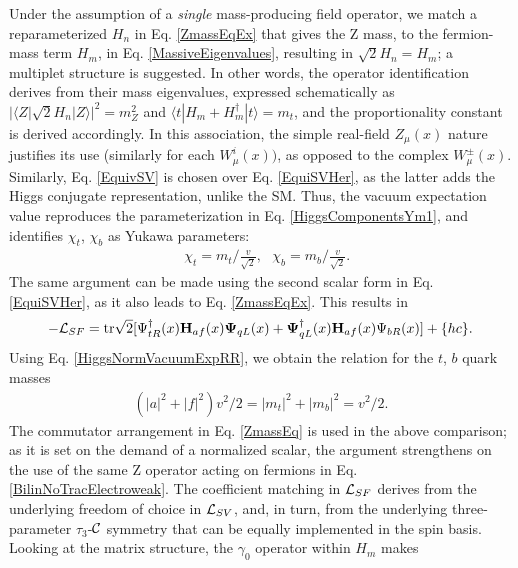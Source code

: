 \documentclass[12pt]{article}
\renewcommand\[{\begin{dmath}}
\renewcommand\]{\end{dmath}}
\newcommand{\boldmathPsi}{\mbox{\boldmath$\Psi$\unboldmath}}
\begin{document}
Under the assumption of a   {\it single} mass-producing field  operator, we match
a reparameterized  $H_n$ in  Eq. \ref{ZmassEqEx} that gives   the  Z  mass,  to   the fermion-mass  term  $H_m$, in Eq.  \ref{MassiveEigenvalues},   resulting in  ${\sqrt{2}H_{n}= }H_{m}$; a  multiplet structure is suggested. In other words,   the operator identification  derives from their mass eigenvalues,  expressed schematically as $|\langle Z |{\sqrt{2}} H_{n}   | Z  \rangle|^2 =m_Z^ 2$ and
  $\langle t |  H_{m} +H_{m}^\dagger | t  \rangle  =m_t $,   and the proportionality constant is  derived  accordingly.
 In this association,   the  simple real-field $Z_\mu(x)$    nature  justifies its use (similarly for each  $W_\mu^i (x) )$,  as opposed to the       complex $W_\mu^\pm(x)$.
 Similarly, Eq. \ref{EquivSV} is chosen over Eq. \ref{EquiSVHer}, as the latter adds the Higgs conjugate representation, unlike the SM.
Thus, the  vacuum expectation value
reproduces  the parameterization in Eq. \ref{HiggsComponentsYm1}, and   identifies  $\chi_t$, $  \chi_b$   as Yukawa parameters: \begin{eqnarray}
\label {YukawaParameters} \ \ \ \  \chi_t= m_t/\frac{v}{\sqrt{2}}  ,  \ \ \  \chi_b= m_b/\frac{v}{\sqrt{2}} .\end{eqnarray} The same argument can be made using the second scalar form in  Eq. \ref{EquiSVHer}, as it also leads to Eq. \ref{ZmassEqEx}. This results in
\begin{eqnarray}
\label {BilinHiggsFerCorrex}
-{\cal L}_{SF}={\rm tr}
 {\sqrt{2}}   [     \Psi_{tR} ^\dagger(x) {\bf H}_{af}(x) { \boldmathPsi}_{qL}(x) +
  {  \boldmathPsi}_{qL}  ^\dagger(x) {\bf H}_{af}(x)  \Psi_{bR} (x)]   +\{ hc \}.
\end{eqnarray}
 Using Eq. \ref{HiggsNormVacuumExpRR},
 we obtain the  relation for the $ t$, $ b$ quark masses
 \begin{eqnarray}
\label  {HiggsNormVacuumEx}
 (|a|^2+|f|^2)v^2/2  = |m_t|^2+|m_b|^2  =v^2/2.
  \end{eqnarray}
  The  commutator arrangement in Eq. \ref{ZmassEq} is used  in the above comparison;  as it  is set on the demand of a  normalized scalar,  the argument strengthens   on the use of the same Z operator  acting on fermions in Eq. \ref{BilinNoTracElectroweak}.
The coefficient matching
 in ${\cal L}_{SF}$    derives from the  underlying freedom of choice in    ${\cal L}_{SV}$,       and, in turn, from the underlying three-parameter $\tau_3$-${\cal C}$ symmetry that can be equally implemented in the spin basis. Looking at the matrix structure, the $\gamma_0$ operator within $H_m$   makes
\end{document}
